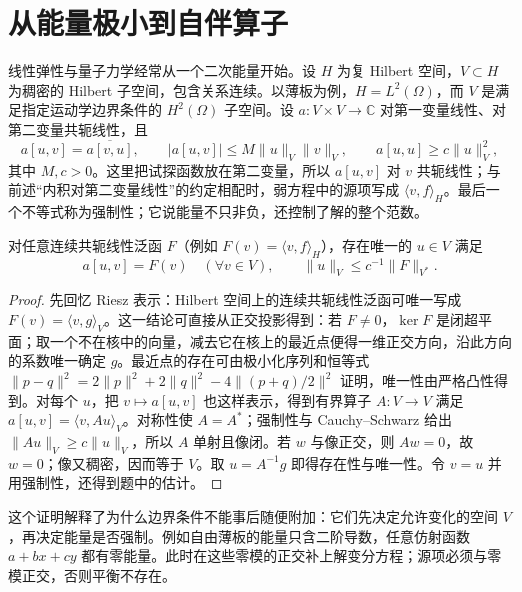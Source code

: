 \section{从能量极小到自伴算子}
\label{sec:advanced-form-method}

线性弹性与量子力学经常从一个二次能量开始。设 \(H\) 为复 Hilbert 空间，\(V\subset H\) 为稠密的 Hilbert 子空间，包含关系连续。以薄板为例，\(H=L^2(\Omega)\)，而 \(V\) 是满足指定运动学边界条件的 \(H^2(\Omega)\) 子空间。设 \(a:V\times V\to\mathbb C\) 对第一变量线性、对第二变量共轭线性，且
\[
 a[u,v]=\overline{a[v,u]},\qquad
 |a[u,v]|\le M\|u\|_V\|v\|_V,
 \qquad a[u,u]\ge c\|u\|_V^2,
\]
其中 \(M,c>0\)。这里把试探函数放在第二变量，所以 \(a[u,v]\) 对 \(v\) 共轭线性；与前述“内积对第二变量线性”的约定相配时，弱方程中的源项写成 \(\langle v,f\rangle_H\)。最后一个不等式称为强制性；它说能量不只非负，还控制了解的整个范数。

\begin{theorem}[强制型变分方程]
对任意连续共轭线性泛函 \(F\)（例如 \(F(v)=\langle v,f\rangle_H\)），存在唯一的 \(u\in V\) 满足
\begin{equation}
 a[u,v]=F(v)\quad(\forall v\in V),
 \qquad \|u\|_V\le c^{-1}\|F\|_{V^*}.
 \label{eq:advanced-coercive-weak}
\end{equation}
\end{theorem}

\begin{proof}
先回忆 Riesz 表示：Hilbert 空间上的连续共轭线性泛函可唯一写成 \(F(v)=\langle v,g\rangle_V\)。这一结论可直接从正交投影得到：若 \(F\ne0\)，\(\ker F\) 是闭超平面；取一个不在核中的向量，减去它在核上的最近点便得一维正交方向，沿此方向的系数唯一确定 \(g\)。最近点的存在可由极小化序列和恒等式
\(\|p-q\|^2=2\|p\|^2+2\|q\|^2-4\|(p+q)/2\|^2\)
证明，唯一性由严格凸性得到。对每个 \(u\)，把 \(v\mapsto a[u,v]\) 也这样表示，得到有界算子 \(A:V\to V\) 满足 \(a[u,v]=\langle v,Au\rangle_V\)。对称性使 \(A=A^*\)；强制性与 Cauchy--Schwarz 给出
\(\|Au\|_V\ge c\|u\|_V\)，所以 \(A\) 单射且像闭。若 \(w\) 与像正交，则 \(Aw=0\)，故 \(w=0\)；像又稠密，因而等于 \(V\)。取 \(u=A^{-1}g\) 即得存在性与唯一性。令 \(v=u\) 并用强制性，还得到题中的估计。
\end{proof}

这个证明解释了为什么边界条件不能事后随便附加：它们先决定允许变化的空间 \(V\)，再决定能量是否强制。例如自由薄板的能量只含二阶导数，任意仿射函数 \(a+bx+cy\) 都有零能量。此时在这些零模的正交补上解变分方程；源项必须与零模正交，否则平衡不存在。

